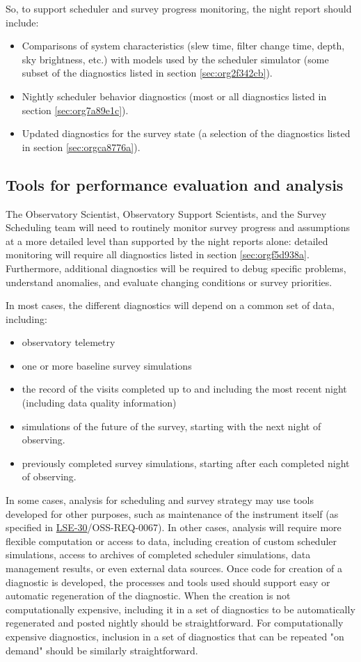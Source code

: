 So, to support scheduler and survey progress monitoring, the night report should include:
\begin{itemize}
\item Comparisons of system characteristics (slew time, filter change time, depth, sky brightness, etc.) with models used by the scheduler simulator (some subset of the diagnostics listed in section \ref{sec:org2f342cb}).
\item Nightly scheduler behavior diagnostics (most or all diagnostics listed in section \ref{sec:org7a89e1c}).
\item Updated diagnostics for the survey state (a selection of the diagnostics listed in section \ref{sec:orgca8776a}).
\end{itemize}

\subsection{Tools for performance evaluation and analysis}
\label{sec:org6742260}
The Observatory Scientist, Observatory Support Scientists, and the Survey Scheduling team will need to routinely monitor survey progress and assumptions at a more detailed level than supported by the night reports alone:
detailed monitoring will require all diagnostics listed in section \ref{sec:orgf5d938a}.
Furthermore, additional diagnostics will be required to debug specific problems, understand anomalies, and evaluate changing conditions or survey priorities.

In most cases, the different diagnostics will depend on a common set of data, including:
\begin{itemize}
\item observatory telemetry
\item one or more baseline survey simulations
\item the record of the visits completed up to and including the most recent night (including data quality information)
\item simulations of the future of the survey, starting with the next night of observing.
\item previously completed survey simulations, starting after each completed night of observing.
\end{itemize}

In some cases, analysis for scheduling and survey strategy may use tools developed for other purposes, such as maintenance of the instrument itself (as specified in \href{https://ls.st/lse-30}{LSE-30}/OSS-REQ-0067).
In other cases, analysis will require more flexible computation or access to data, including creation of custom scheduler simulations, access to archives of completed scheduler simulations, data management results, or even external data sources.
Once code for creation of a diagnostic is developed, the processes and tools used should support easy or automatic regeneration of the diagnostic.
When the creation is not computationally expensive, including it in a set of diagnostics to be automatically regenerated and posted nightly should be straightforward.
For computationally expensive diagnostics, inclusion in a set of diagnostics that can be repeated "on demand" should be similarly straightforward.

